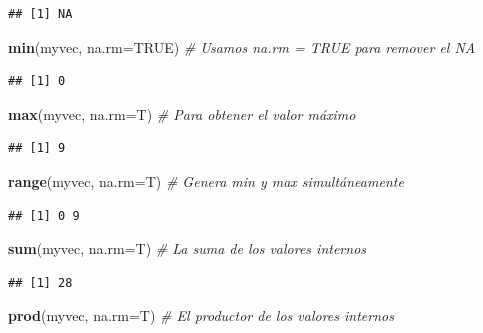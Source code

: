 \documentclass[10pt,]{krantz}
\makeatletter
\newenvironment{Shaded}{\begin{snugshade}}{\end{snugshade}}
\newcommand{\KeywordTok}[1]{\textcolor[rgb]{0.13,0.29,0.53}{\textbf{{#1}}}}
\newcommand{\DataTypeTok}[1]{\textcolor[rgb]{0.13,0.29,0.53}{{#1}}}
\newcommand{\CommentTok}[1]{\textcolor[rgb]{0.56,0.35,0.01}{\textit{{#1}}}}
\newcommand{\OtherTok}[1]{\textcolor[rgb]{0.56,0.35,0.01}{{#1}}}
\newcommand{\NormalTok}[1]{{#1}}
\newenvironment{kframe}{%
\medskip{}
\setlength{\fboxsep}{.8em}
 \def\at@end@of@kframe{}%
 \ifinner\ifhmode%
  \def\at@end@of@kframe{\end{minipage}}%
  \begin{minipage}{\columnwidth}%
 \fi\fi%
 \def\FrameCommand##1{\hskip\@totalleftmargin \hskip-\fboxsep
 \colorbox{shadecolor}{##1}\hskip-\fboxsep
     \hskip-\linewidth \hskip-\@totalleftmargin \hskip\columnwidth}%
 \MakeFramed {\advance\hsize-\width
   \@totalleftmargin\z@ \linewidth\hsize
   \@setminipage}}%
 {\par\unskip\endMakeFramed%
 \at@end@of@kframe}
\renewenvironment{Shaded}{\begin{kframe}}{\end{kframe}}
\makeatother
\begin{document}
\begin{verbatim}
## [1] NA
\end{verbatim}

\begin{Shaded}
\begin{Highlighting}[]
\KeywordTok{min}\NormalTok{(myvec, }\DataTypeTok{na.rm=}\OtherTok{TRUE}\NormalTok{)  }\CommentTok{# Usamos na.rm = TRUE para remover el NA}
\end{Highlighting}
\end{Shaded}

\begin{verbatim}
## [1] 0
\end{verbatim}

\begin{Shaded}
\begin{Highlighting}[]
\KeywordTok{max}\NormalTok{(myvec, }\DataTypeTok{na.rm=}\NormalTok{T)  }\CommentTok{# Para obtener el valor máximo}
\end{Highlighting}
\end{Shaded}

\begin{verbatim}
## [1] 9
\end{verbatim}

\begin{Shaded}
\begin{Highlighting}[]
\KeywordTok{range}\NormalTok{(myvec, }\DataTypeTok{na.rm=}\NormalTok{T)  }\CommentTok{# Genera min y max simultáneamente}
\end{Highlighting}
\end{Shaded}

\begin{verbatim}
## [1] 0 9
\end{verbatim}

\begin{Shaded}
\begin{Highlighting}[]
\KeywordTok{sum}\NormalTok{(myvec, }\DataTypeTok{na.rm=}\NormalTok{T)  }\CommentTok{# La suma de los valores internos}
\end{Highlighting}
\end{Shaded}

\begin{verbatim}
## [1] 28
\end{verbatim}

\begin{Shaded}
\begin{Highlighting}[]
\KeywordTok{prod}\NormalTok{(myvec, }\DataTypeTok{na.rm=}\NormalTok{T)  }\CommentTok{# El productor de los valores internos}
\end{Highlighting}
\end{Shaded}
\end{document}

